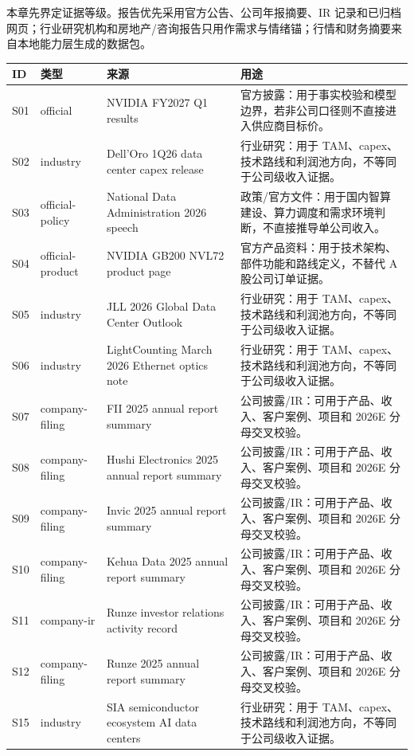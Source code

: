 本章先界定证据等级。报告优先采用官方公告、公司年报摘要、IR 记录和已归档网页；行业研究机构和房地产/咨询报告只用作需求与情绪锚；行情和财务摘要来自本地能力层生成的数据包。

\begin{exhibitbox}[来源等级表]
\scriptsize
\begin{longtable}{L{1.0cm}L{2.3cm}L{4.0cm}L{7.0cm}}
\toprule
\textbf{ID} & \textbf{类型} & \textbf{来源} & \textbf{用途}\\
\midrule
\endhead
S01 & official & NVIDIA FY2027 Q1 results & 官方披露：用于事实校验和模型边界，若非公司口径则不直接进入供应商目标价。\\
S02 & industry & Dell'Oro 1Q26 data center capex release & 行业研究：用于 TAM、capex、技术路线和利润池方向，不等同于公司级收入证据。\\
S03 & official-policy & National Data Administration 2026 speech & 政策/官方文件：用于国内智算建设、算力调度和需求环境判断，不直接推导单公司收入。\\
S04 & official-product & NVIDIA GB200 NVL72 product page & 官方产品资料：用于技术架构、部件功能和路线定义，不替代 A 股公司订单证据。\\
S05 & industry & JLL 2026 Global Data Center Outlook & 行业研究：用于 TAM、capex、技术路线和利润池方向，不等同于公司级收入证据。\\
S06 & industry & LightCounting March 2026 Ethernet optics note & 行业研究：用于 TAM、capex、技术路线和利润池方向，不等同于公司级收入证据。\\
S07 & company-filing & FII 2025 annual report summary & 公司披露/IR：可用于产品、收入、客户案例、项目和 2026E 分母交叉校验。\\
S08 & company-filing & Hushi Electronics 2025 annual report summary & 公司披露/IR：可用于产品、收入、客户案例、项目和 2026E 分母交叉校验。\\
S09 & company-filing & Invic 2025 annual report summary & 公司披露/IR：可用于产品、收入、客户案例、项目和 2026E 分母交叉校验。\\
S10 & company-filing & Kehua Data 2025 annual report summary & 公司披露/IR：可用于产品、收入、客户案例、项目和 2026E 分母交叉校验。\\
S11 & company-ir & Runze investor relations activity record & 公司披露/IR：可用于产品、收入、客户案例、项目和 2026E 分母交叉校验。\\
S12 & company-filing & Runze 2025 annual report summary & 公司披露/IR：可用于产品、收入、客户案例、项目和 2026E 分母交叉校验。\\
S15 & industry & SIA semiconductor ecosystem AI data centers & 行业研究：用于 TAM、capex、技术路线和利润池方向，不等同于公司级收入证据。\\

\end{longtable}
\end{exhibitbox}
